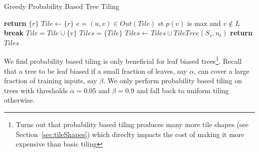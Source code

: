 \begin{algorithm}
    \caption{Greedy Probability Based Tree Tiling}
    \label{Alg:GreedyTilingAlgo}
    \begin{algorithmic}
                \State \textbf{return} $\{ r \}$
            \EndIf
            \State $Tile \leftarrow \{ r \}$
                \State $e = (u,v) \in Out(Tile)$ st $p(v)$ is max and $v \notin L$
                    \State \textbf{break}
                \EndIf
                \State $Tile = Tile \cup \{ v \}$
            \EndWhile
            \State $Tiles =  \{ Tile \}$
                \State $Tiles \leftarrow Tiles \cup TileTree(S_v, n_t)$
            \EndFor
            \State \textbf{return} $Tiles$
        \EndProcedure
    \end{algorithmic}
\end{algorithm}

We find probability based tiling is only beneficial for leaf biased trees\footnote{Turns out that probability based tiling produces many more tile shapes (see Section~\ref{sec:tileShapes}) which direclty impacts the cost of  making it more expensive than basic tiling}.  Recall that   
a tree to be leaf biased if a small fraction of leaves, say $\alpha$, can cover a large fraction of training inputs, say $\beta$.
We only perform probability based tiling on trees with thresholds $\alpha=0.05$ and $\beta=0.9$ and fall back to uniform tiling otherwise. 



